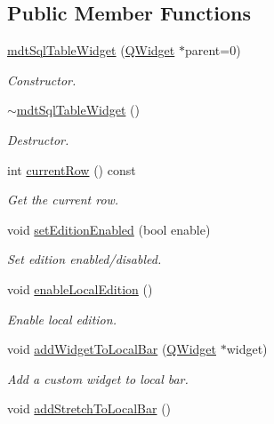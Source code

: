 \subsection*{Public Member Functions}
\begin{DoxyCompactItemize}
\item 
\hyperlink{classmdt_sql_table_widget_a4cf2b0d69608e88d33996148f612e58d}{mdt\-Sql\-Table\-Widget} (\hyperlink{class_q_widget}{Q\-Widget} $\ast$parent=0)
\begin{DoxyCompactList}\small\item\em Constructor. \end{DoxyCompactList}\item 
\hyperlink{classmdt_sql_table_widget_ab5db8a20c64340bba4841a1b1c928d7f}{$\sim$mdt\-Sql\-Table\-Widget} ()
\begin{DoxyCompactList}\small\item\em Destructor. \end{DoxyCompactList}\item 
int \hyperlink{classmdt_sql_table_widget_a7612cf9cb10c69365b7ed820d71e6cb2}{current\-Row} () const 
\begin{DoxyCompactList}\small\item\em Get the current row. \end{DoxyCompactList}\item 
void \hyperlink{classmdt_sql_table_widget_af5ef66b8ebb45a698f99ad455208f3c8}{set\-Edition\-Enabled} (bool enable)
\begin{DoxyCompactList}\small\item\em Set edition enabled/disabled. \end{DoxyCompactList}\item 
void \hyperlink{classmdt_sql_table_widget_a39422fb9522ee73513f13d8bcb91a143}{enable\-Local\-Edition} ()
\begin{DoxyCompactList}\small\item\em Enable local edition. \end{DoxyCompactList}\item 
void \hyperlink{classmdt_sql_table_widget_a9c0ae7b87d1840f2fdcee6de763fe31a}{add\-Widget\-To\-Local\-Bar} (\hyperlink{class_q_widget}{Q\-Widget} $\ast$widget)
\begin{DoxyCompactList}\small\item\em Add a custom widget to local bar. \end{DoxyCompactList}\item 
void \hyperlink{classmdt_sql_table_widget_a6cf9f08b98dd3df16d36c29db7175633}{add\-Stretch\-To\-Local\-Bar} ()

\end{DoxyCompactItemize}
